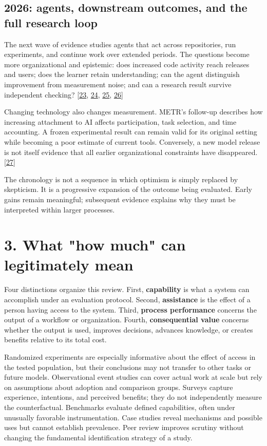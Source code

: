 \subsection*{2026: agents, downstream outcomes, and the full research loop}
The next wave of evidence studies agents that act across repositories, run experiments, and continue work over extended periods. The questions become more organizational and epistemic: does increased code activity reach releases and users; does the learner retain understanding; can the agent distinguish improvement from measurement noise; and can a research result survive independent checking? [\hyperlink{ref-demirer2026}{23}, \hyperlink{ref-chenstratton2026}{24}, \hyperlink{ref-bergh2026}{25}, \hyperlink{ref-innovationeval2026}{26}]


Changing technology also changes measurement. METR's follow-up describes how increasing attachment to AI affects participation, task selection, and time accounting. A frozen experimental result can remain valid for its original setting while becoming a poor estimate of current tools. Conversely, a new model release is not itself evidence that all earlier organizational constraints have disappeared. [\hyperlink{ref-metr2026update}{27}]


The chronology is not a sequence in which optimism is simply replaced by skepticism. It is a progressive expansion of the outcome being evaluated. Early gains remain meaningful; subsequent evidence explains why they must be interpreted within larger processes.



\section*{3. What "how much" can legitimately mean}
Four distinctions organize this review. First, \textbf{capability} is what a system can accomplish under an evaluation protocol. Second, \textbf{assistance} is the effect of a person having access to the system. Third, \textbf{process performance} concerns the output of a workflow or organization. Fourth, \textbf{consequential value} concerns whether the output is used, improves decisions, advances knowledge, or creates benefits relative to its total cost.


Randomized experiments are especially informative about the effect of access in the tested population, but their conclusions may not transfer to other tasks or future models. Observational event studies can cover actual work at scale but rely on assumptions about adoption and comparison groups. Surveys capture experience, intentions, and perceived benefits; they do not independently measure the counterfactual. Benchmarks evaluate defined capabilities, often under unusually favorable instrumentation. Case studies reveal mechanisms and possible uses but cannot establish prevalence. Peer review improves scrutiny without changing the fundamental identification strategy of a study.


